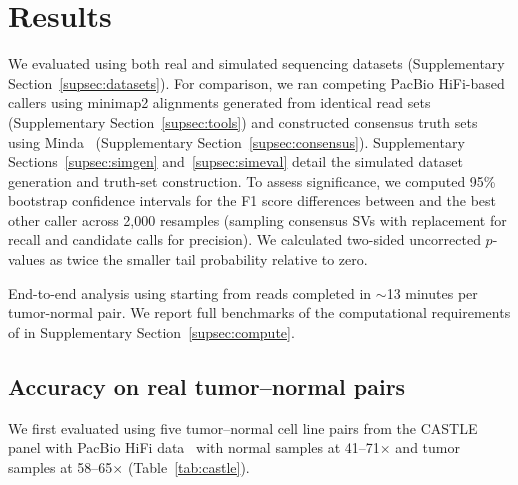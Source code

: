 \section{Results}\label{sec:results}
We evaluated \tool using both real and simulated sequencing datasets (Supplementary Section~\ref{supsec:datasets}).
For comparison, we ran competing PacBio HiFi-based callers using minimap2 alignments generated from identical read sets (Supplementary Section~\ref{supsec:tools}) and constructed consensus truth sets using Minda~\cite{minda} (Supplementary Section~\ref{supsec:consensus}).
Supplementary Sections~\ref{supsec:simgen} and~\ref{supsec:simeval} detail the simulated dataset generation and truth-set construction.
To assess significance, we computed 95\% bootstrap confidence intervals for the F1 score differences between \tool and the best other caller across 2,000 resamples (sampling consensus SVs with replacement for recall and candidate calls for precision).
We calculated two-sided uncorrected $p$-values as twice the smaller tail probability relative to zero. 

End-to-end analysis using \tool starting from reads completed in $\sim$13 minutes per tumor-normal pair. We report full benchmarks of the computational requirements of \tool in Supplementary Section~\ref{supsec:compute}.

\subsection{Accuracy on real tumor--normal pairs}\label{sec:accuracy}

We first evaluated \tool{} using five tumor--normal cell line pairs from the CASTLE panel with PacBio HiFi data~\cite{severus} with normal samples at 41--71$\times$ and tumor samples at 58--65$\times$ (Table~\ref{tab:castle}).


